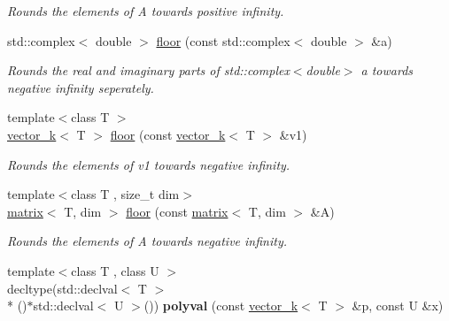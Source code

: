 \begin{DoxyCompactItemize}
\begin{DoxyCompactList}\small\item\em Rounds the elements of A towards positive infinity. \end{DoxyCompactList}\item 
\hypertarget{namespacekeycpp_ab30437496fbd2011521b31aee7961516}{std\-::complex$<$ double $>$ \hyperlink{namespacekeycpp_ab30437496fbd2011521b31aee7961516}{floor} (const std\-::complex$<$ double $>$ \&a)}\label{namespacekeycpp_ab30437496fbd2011521b31aee7961516}

\begin{DoxyCompactList}\small\item\em Rounds the real and imaginary parts of std\-::complex$<$double$>$ a towards negative infinity seperately. \end{DoxyCompactList}\item 
\hypertarget{namespacekeycpp_ac2f984ff29cefe4dc924cb6d69e53786}{{\footnotesize template$<$class T $>$ }\\\hyperlink{classkeycpp_1_1vector__k}{vector\-\_\-k}$<$ T $>$ \hyperlink{namespacekeycpp_ac2f984ff29cefe4dc924cb6d69e53786}{floor} (const \hyperlink{classkeycpp_1_1vector__k}{vector\-\_\-k}$<$ T $>$ \&v1)}\label{namespacekeycpp_ac2f984ff29cefe4dc924cb6d69e53786}

\begin{DoxyCompactList}\small\item\em Rounds the elements of v1 towards negative infinity. \end{DoxyCompactList}\item 
\hypertarget{namespacekeycpp_a8aad0f0ac8036ee114a14da17aefcb5f}{{\footnotesize template$<$class T , size\-\_\-t dim$>$ }\\\hyperlink{classkeycpp_1_1matrix}{matrix}$<$ T, dim $>$ \hyperlink{namespacekeycpp_a8aad0f0ac8036ee114a14da17aefcb5f}{floor} (const \hyperlink{classkeycpp_1_1matrix}{matrix}$<$ T, dim $>$ \&A)}\label{namespacekeycpp_a8aad0f0ac8036ee114a14da17aefcb5f}

\begin{DoxyCompactList}\small\item\em Rounds the elements of A towards negative infinity. \end{DoxyCompactList}\item 
\hypertarget{namespacekeycpp_ae7de6c3e5c495e91b1b1de7d716e7a5d}{{\footnotesize template$<$class T , class U $>$ }\\decltype(std\-::declval$<$ T $>$\\*
()$\ast$std\-::declval$<$ U $>$()) {\bfseries polyval} (const \hyperlink{classkeycpp_1_1vector__k}{vector\-\_\-k}$<$ T $>$ \&p, const U \&x)}\label{namespacekeycpp_ae7de6c3e5c495e91b1b1de7d716e7a5d}


\end{DoxyCompactItemize}
